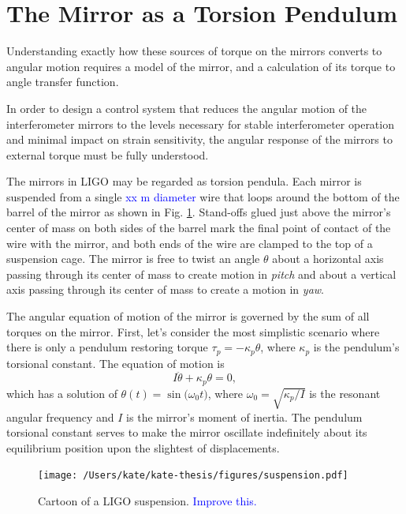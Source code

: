 \section{The Mirror as a Torsion Pendulum}
\label{sec:pendTF}
Understanding exactly how these sources of torque on the mirrors converts to angular motion requires a model of the mirror, and a calculation of its torque to angle transfer function. 

In order to design a control system that reduces the angular motion of
the interferometer mirrors to the levels necessary for stable
interferometer operation and minimal impact on strain sensitivity, the
angular response of the mirrors to external torque must be fully
understood. 

The mirrors in LIGO may be regarded as torsion pendula. Each mirror is
suspended from a single \textcolor{blue}{xx m diameter} wire that
loops around the bottom of the barrel of the mirror as shown in
Fig. \ref{fig:suspension}. Stand-offs glued just above the mirror's
center of mass on both sides of the barrel mark the final point of
contact of the wire with the mirror, and both ends of the wire are
clamped to the top of a suspension cage. The mirror is free to twist
an angle $\theta$ about a horizontal axis passing through its center
of mass to create motion in \emph{pitch} and about a vertical axis
passing through its center of mass to create a motion in \emph{yaw}.

The angular equation of motion of the mirror is governed by the sum of
all torques on the mirror. First, let's consider the most simplistic
scenario where there is only a pendulum restoring torque
$\tau_p=-\kappa_p \theta$, where $\kappa_p$ is the pendulum's
torsional constant. The equation of motion is
\begin{equation}
I \ddot{\theta} + \kappa_p \theta = 0,
\end{equation}
which has a solution of $\theta(t) = \sin({\omega_0 t)}$, where
$\omega_0 = \sqrt{\kappa_p/I}$ is the resonant angular frequency and
$I$ is the mirror's moment of inertia. The pendulum torsional constant
serves to make the mirror oscillate indefinitely about its equilibrium
position upon the slightest of displacements.

\begin{figure}
\begin{centering}
\texttt{[image: /Users/kate/kate-thesis/figures/suspension.pdf]}
\caption[Sketch of a LIGO suspension]{Cartoon of a LIGO
  suspension. \textcolor{blue}{Improve this.}}
\label{fig:suspension}
\end{centering}
\end{figure}




